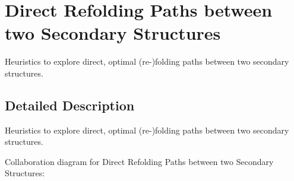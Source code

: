 \hypertarget{group__paths__direct}{}\section{Direct Refolding Paths between two Secondary Structures}
\label{group__paths__direct}


Heuristics to explore direct, optimal (re-\/)folding paths between two secondary structures.  




\subsection{Detailed Description}
Heuristics to explore direct, optimal (re-\/)folding paths between two secondary structures. 

Collaboration diagram for Direct Refolding Paths between two Secondary Structures\+:

